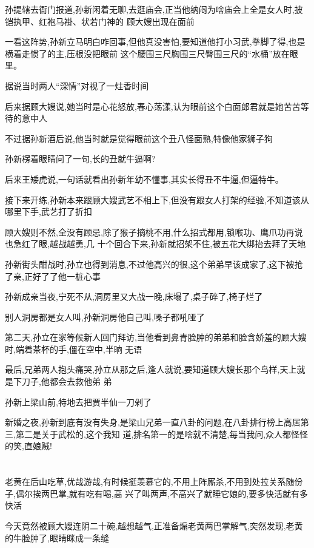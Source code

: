 ﻿\documentclass[12pt]{article}
\begin{document}
孙提辖去衙门报道,孙新闲着无聊,去逛庙会,正当他纳闷为啥庙会上全是女人时,披铠执甲、红袍马褂、状若门神的
顾大嫂出现在面前

一看这阵势,孙新立马明白咋回事,但他真没害怕,要知道他打小习武,拳脚了得,也是横着走惯了的主,压根没把眼前
这个腰围三尺胸围三尺臀围三尺的``水桶''放在眼里。

据说当时两人``深情''对视了一炷香时间

后来据顾大嫂说,她当时是心花怒放,春心荡漾,认为眼前这个白面郎君就是她苦苦等待的意中人

不过据孙新酒后说,他当时就是觉得眼前这个丑八怪面熟,特像他家狮子狗

孙新楞着眼睛问了一句,长的丑就牛逼啊?

后来王矮虎说,一句话就看出孙新年幼不懂事,其实长得丑不牛逼,但逼特牛。

接下来开练,孙新本来跟顾大嫂武艺不相上下,但没有跟女人打架的经验,不知道该从哪里下手,武艺打了折扣

顾大嫂则不然,全没有顾忌,除了猴子摘桃不用,什么招式都用,锁喉功、鹰爪功\dldots 再说也急红了眼,越战越勇,几
十个回合下来,孙新就招架不住,被五花大绑抬去拜了天地

孙新街头酣战时,孙立也得到消息,不过他高兴的很,这个弟弟早该成家了,这下被抢了亲,正好了了他一桩心事

孙新成亲当夜,宁死不从,洞房里又大战一晚,床塌了,桌子碎了,椅子烂了\dldots

别人洞房都是女人叫,孙新洞房他自己叫,嗓子都吼哑了

第二天,孙立在家等候新人回门拜访,当他看到鼻青脸肿的弟弟和脸含娇羞的顾大嫂时,端着茶杯的手,僵在空中,半晌
无语

最后,兄弟两人抱头痛哭,孙立从那之后,逢人就说,要知道顾大嫂长那个鸟样,天上就是下刀子,他都会去救他弟
弟\dldots

孙新上梁山前,特地去把贾半仙一刀剁了

新婚之夜,孙新到底有没有失身,是梁山兄弟一直八卦的问题,在八卦排行榜上高居第三,第二是关于武松的,这个我知
道,排名第一的是啥就不清楚,每当我问,众人都怪怪的笑,直娘贼!

\section{}

老黄在后山吃草,优哉游哉,有时候挺羡慕它的,不用上阵厮杀,不用到处拉关系随份子,偶尔挨两巴掌,就有吃有喝,高
兴了叫两声,不高兴了就睡它娘的,要多快活就有多快活\dldots

今天竟然被顾大嫂连阴二十碗,越想越气,正准备煽老黄两巴掌解气,突然发现,老黄的牛脸肿了,眼睛眯成一条缝
\end{document}
